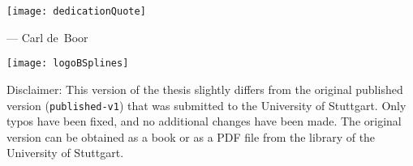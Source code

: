 \vspace*{\fill}

\begin{center}
  \texttt{[image: dedicationQuote]}
  
  \begin{minipage}{0.6\textwidth}%
    \begin{flushright}
      \small--- Carl de~Boor \cite{Boor16Comment}
    \end{flushright}
  \end{minipage}
\end{center}

\vspace*{\fill}

\begin{center}
  \texttt{[image: logoBSplines]}%
\end{center}

\vspace*{\fill}

\clearpage

\vspace*{\fill}

{%
  \setlength{\parindent}{0pt}
  
  Disclaimer:
  This version of the thesis slightly differs from the
  original published version (\texttt{published-v1})
  that was submitted to the University of Stuttgart.
  Only typos have been fixed, and no additional changes have been made.
  The original version can be obtained as a book or as a PDF file from
  the library of the University of Stuttgart.%
}

\cleardoublepage
